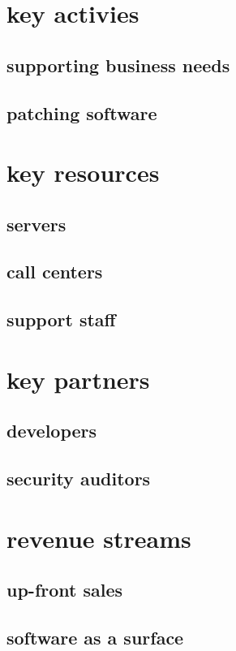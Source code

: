 \documentclass[letterpaper]{article}
\begin{document}
\section{key activies}
\label{sec:org5eef80b}
\subsection{supporting business needs}
\label{sec:org87daedc}
\subsection{patching software}
\label{sec:orgbd37171}
\section{key resources}
\label{sec:org513664d}
\subsection{servers}
\label{sec:org089af68}
\subsection{call centers}
\label{sec:orge5eee57}
\subsection{support staff}
\label{sec:orgc415b05}
\section{key partners}
\label{sec:orgf9329ca}
\subsection{developers}
\label{sec:orge0103f7}
\subsection{security auditors}
\label{sec:orge8ba41c}
\section{revenue streams}
\label{sec:orgdf29d64}
\subsection{up-front sales}
\label{sec:org4ca3142}
\subsection{software as a surface}
\label{sec:org767e71a}
\end{document}
